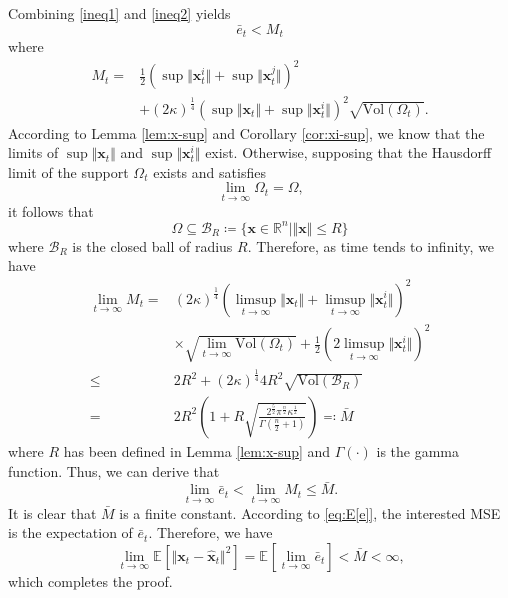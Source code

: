 \documentclass[10pt,twocolumn,twoside]{IEEEtran}
\newcommand{\E}[2][]{ \mathbb{E}_{#1}\left[#2\right] } %
\newcommand{\cm}{\text{,}} %
\newcommand{\fs}{\text{.}} %
\newcommand{\x}{{ \bm{x} }}
\begin{document}
\begin{appendices}
Combining \eqref{ineq1} and \eqref{ineq2} yields 
$$
\bar{e}_t < M_t
$$
where
\begin{equation*}
\begin{split}
    M_t ={}& \frac{1}{2}(\sup\Vert\x_t^i\Vert+\sup\Vert\x_t^j\Vert)^2 \\
    &+ (2\kappa)^\frac{1}{4}(\sup\Vert\x_t\Vert+\sup\Vert\x_t^i\Vert)^2\sqrt{\mathrm{Vol}(\Omega_t)} \fs
\end{split}
\end{equation*}
According to Lemma \ref{lem:x-sup} and Corollary \ref{cor:xi-sup}, we know that the limits of $\sup\Vert\x_t\Vert$ and $\sup\Vert\x_t^i\Vert$ exist. Otherwise, supposing that the Hausdorff limit of the support $\Omega_t$ exists and satisfies
$$
\lim_{t\rightarrow\infty}\Omega_t = \Omega \cm
$$
it follows that
$$
\Omega \subseteq \mathcal{B}_R \coloneqq \{\x\in\mathbb{R}^n\mid \Vert\x\Vert\leq R\}
$$
where $\mathcal{B}_R$ is the closed ball of radius $R$. Therefore, as time tends to infinity, we have
\begin{equation*}
\begin{split}
    \lim_{t\rightarrow\infty}M_t ={}& (2\kappa)^\frac{1}{4}(\limsup_{t\rightarrow\infty}\Vert\x_t\Vert+\limsup_{t\rightarrow\infty}\Vert\x_t^i\Vert)^2 \\
    &\times \sqrt{\lim_{t\rightarrow\infty}\mathrm{Vol}(\Omega_t)} + \frac{1}{2}(2\limsup_{t\rightarrow\infty}\Vert\x_t^i\Vert)^2\\
    \leq{}& 2R^2 + (2\kappa)^\frac{1}{4}4R^2\sqrt{\mathrm{Vol}(\mathcal{B}_R)} \\
    ={}& 2R^2\left(1 + R\sqrt{\frac{2^\frac{5}{2}\pi^{\frac{n}{2}}\kappa^\frac{1}{2}}{\Gamma(\frac{n}{2}+1)}}\right) \eqqcolon \bar{M}
\end{split}
\end{equation*}
where $R$ has been defined in Lemma \ref{lem:x-sup} and $\Gamma(\cdot)$ is the gamma function. Thus, we can derive that
$$
\lim_{t\rightarrow\infty}\bar{e}_t < \lim_{t\rightarrow\infty}M_t \leq \bar{M} \fs
$$
It is clear that $\bar{M}$ is a finite constant. According to \eqref{eq:E[e]}, the interested MSE is the expectation of $\bar{e}_t$. Therefore, we have
$$
\lim_{t\rightarrow\infty}\E{\Vert\x_t-\hat\x_t\Vert^2} = \E{\lim_{t\rightarrow\infty}\bar{e}_t} < \bar{M} < \infty \cm
$$
which completes the proof.

\end{appendices}



\end{document}
